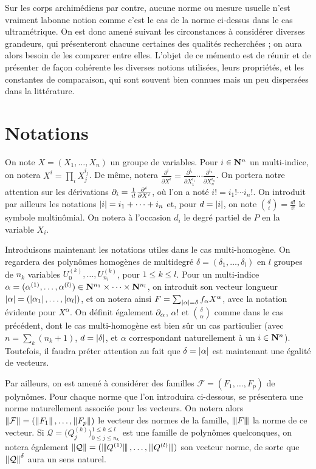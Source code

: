 Sur les corps archimédiens par contre, aucune norme ou mesure usuelle n'est
vraiment \og la\fg bonne notion comme c'est le cas de la norme ci-dessus dans
le cas ultramétrique. On est donc amené suivant les circonstances à considérer
diverses grandeurs, qui présenteront chacune certaines des qualités
recherchées ; on aura alors besoin de les comparer entre elles. L'objet de ce
mémento est de réunir et de présenter de façon cohérente les diverses notions
utilisées, leurs propriétés, et les constantes de comparaison, qui sont
souvent bien connues mais un peu dispersées dans la littérature.

\section{Notations}

On note $X = (X_1, \dots, X_n)$ un groupe de variables. Pour $i \in \mathbf{N}^n$ un
multi-indice, on notera $X^i = \prod_i X_j^{i_j}$. De même, notera
$\frac{\partial^i}{\partial X^i} = \frac{\partial^{i_1}}{\partial
  X_1^{i_1}}\cdots\frac{\partial^{i_n}}{\partial X_n^{i_n}}$. On portera notre
attention sur les dérivations $\partial_{i} = \frac1{i!}\frac{\partial^i}{\partial
  X^i}$, où l'on a noté $i! = i_1! \cdots i_n!$. On introduit par ailleurs les
notations $\left\lvert i\right\rvert = i_1 + \dots + i_n$ et, pour $d = \left\lvert i\right\rvert$, on note
$\binom{d}{i} = \frac{d!}{i!}$ le symbole multinômial. On notera à l'occasion
$d_i$ le degré partiel de $P$ en la variable $X_i$.

Introduisons maintenant les notations utiles dans le cas multi-homogène. On
regardera des polynômes homogènes de multidegré $\delta = (\delta_1, \dots,
\delta_l)$ en $l$ groupes de $n_k$ variables $U_0^{(k)}, \dots,
U_{n_l}^{(k)}$, pour $1\le k \le l$. Pour un multi-indice $\alpha =
(\alpha^{(1)}, \dots, \alpha^{(l)}) \in \mathbf{N}^{n_1} \times \dots \times
\mathbf{N}^{n_l}$, on introduit son vecteur longueur $\left\lvert\alpha\right\rvert =
(\left\lvert\alpha_1\right\rvert,\dots, \left\lvert\alpha_l\right\rvert)$, et on notera ainsi $F =
\sum_{\left\lvert\alpha\right\rvert = \delta} f_\alpha X^\alpha$, avec la notation évidente pour
$X^\alpha$. On définit également $\partial_{\alpha}$, $\alpha!$ et
$\binom{\delta}{\alpha}$ comme dans le cas précédent, dont le cas
multi-homogène est bien sûr un cas particulier (avec $n = \sum_k (n_k + 1)$,
$d = \left\lvert\delta\right\rvert$, et $\alpha$ correspondant naturellement à un $i \in \mathbf{N}^n$).
Toutefois, il faudra préter attention au fait que $\delta = \left\lvert\alpha\right\rvert$ est
maintenant une égalité de vecteurs.

Par ailleurs, on est amené à considérer des familles $\mathcal F = (F_1,
\dots, F_p)$ de polynômes. Pour chaque norme que l'on introduira ci-dessous,
se présentera une norme naturellement associée pour les vecteurs. On notera
alors $\left\lVert\mathcal F\right\rVert = (\left\lVert F_1\right\rVert, \ldots, \left\lVert F_p\right\rVert)$ le vecteur des
normes de la famille, $\left\lvert\hspace{-1pt}\left\lvert\hspace{-1pt} \left\lvert F\right\rvert \hspace{-1pt}\right\rvert\hspace{-1pt}\right\rvert$ la norme de ce vecteur. Si $\mathcal Q =
\big(Q_j^{(k)}\big)_{0 \le j \le n_k}^{1 \le k \le l}$ est une famille de
polynômes quelconques, on notera également $\left\lVert\mathcal Q\right\rVert =
(\left\lvert\hspace{-1pt}\left\lvert\hspace{-1pt} \left\lvert\smash{Q^{(1)}}\right\rvert \hspace{-1pt}\right\rvert\hspace{-1pt}\right\rvert, \ldots, \left\lvert\hspace{-1pt}\left\lvert\hspace{-1pt} \left\lvert\smash{Q^{(l)}}\right\rvert \hspace{-1pt}\right\rvert\hspace{-1pt}\right\rvert)$ son vecteur norme,
de sorte que $\left\lVert\mathcal Q\right\rVert ^\delta$ aura un sens naturel. 

